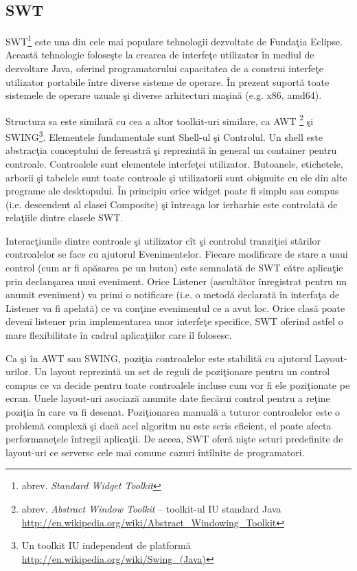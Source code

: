 \subsection{SWT}
SWT\footnote{abrev. \textit{Standard Widget Toolkit}} este una din cele mai 
populare tehnologii dezvoltate de Fundaţia Eclipse. Această tehnologie 
foloseşte la crearea de interfeţe utilizator în mediul de dezvoltare Java, 
oferind programatorului capacitatea de a construi interfeţe utilizator 
portabile între diverse sisteme de operare. În prezent suportă toate sistemele 
de operare uzuale şi diverse arhitecturi maşină (e.g. x86, amd64).

Structura sa este similară cu cea a altor toolkit-uri similare, ca AWT 
\footnote{abrev. \textit{Abstract Window Toolkit} -- toolkit-ul IU standard 
Java \url{http://en.wikipedia.org/wiki/Abstract_Windowing_Toolkit}} şi 
SWING\footnote{Un toolkit IU independent de platformă 
\url{http://en.wikipedia.org/wiki/Swing_(Java)}}. Elementele fundamentale sunt 
Shell-ul şi Controlul. Un shell este abstracţia conceptului de fereastră şi 
reprezintă în general un container pentru controale. Controalele sunt 
elementele interfeţei utilizator. Butoanele, etichetele, arborii şi tabelele 
sunt toate controale şi utilizatorii sunt obişnuite cu ele din alte programe 
ale desktopului. \cite{swt} În principiu orice widget poate fi simplu sau 
compus (i.e. descendent al clasei Composite) şi întreaga lor ierharhie este 
controlată de relaţiile dintre clasele SWT.

Interacţiunile dintre controale şi utilizator cît şi controlul tranziţiei 
stărilor controalelor se face cu ajutorul Evenimentelor. Fiecare modificare de 
stare a unui control (cum ar fi apăsarea pe un buton) este semnalată de SWT 
către aplicaţie prin declanşarea unui eveniment. Orice Listener (ascultător 
înregistrat pentru un anumit eveniment) va primi o notificare (i.e. o metodă 
declarată în interfaţa de Listener va fi apelată) ce va conţine evenimentul ce 
a avut loc. Orice clasă poate deveni listener prin implementarea unor interfeţe 
specifice, SWT oferind astfel o mare flexibilitate în cadrul aplicaţiilor care 
îl folosesc.

Ca şi în AWT sau SWING, poziţia controalelor este stabilită cu ajutorul 
Layout-urilor. Un layout reprezintă un set de reguli de poziţionare pentru un 
control compus ce va decide pentru toate controalele incluse cum vor fi ele 
poziţionate pe ecran. Unele layout-uri asociază anumite date fiecărui control 
pentru a reţine poziţia în care va fi desenat. Poziţionarea manuală a tuturor 
controalelor este o problemă complexă şi dacă acel algoritm nu este scris 
eficient, el poate afecta performaneţele întregii aplicaţii. De aceea, SWT 
oferă nişte seturi predefinite de layout-uri ce serversc cele mai comune cazuri 
întîlnite de programatori.

